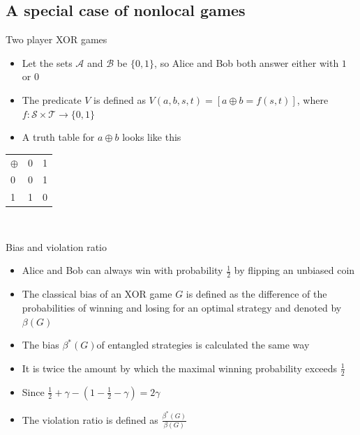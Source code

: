 \subsection{A special case of nonlocal games}
\begin{frame}{Two player XOR games}
\begin{itemize}
    \item Let the sets $\mathcal{A}$ and $\mathcal{B}$ be $\{0,1\}$, so Alice and Bob both answer either with $1$ or $0$
    \item The predicate $V$ is defined as $V(a,b,s,t) = [ a\oplus b = f(s,t)]$, where $f: \mathcal{S} \times \mathcal{T} \rightarrow \{0,1\}$
    \item A truth table for $a \oplus b$ looks like this
\end{itemize}
    \begin{center}
\begin{tabular}{l | c r }
$\oplus$ & 0 & 1 \\
\cline{1-3} 

0 & 0 & 1 \\
1 & 1 & 0 
\end{tabular}\\
\end{center}
\end{frame}

\begin{frame}{Bias and violation ratio}
\begin{itemize}
    \item Alice and Bob can always win with probability $\frac{1}{2}$ by flipping an unbiased coin
    \item The classical bias of an XOR game $G$ is defined as the difference of the probabilities of winning and losing for an optimal strategy and denoted by $\beta(G)$
    \item The bias $\beta^*(G)$of entangled strategies is calculated the same way 
    \item It is twice the amount by which the maximal winning probability exceeds $\frac{1}{2}$
    \item Since $\frac{1}{2}+ \gamma -(1-\frac{1}{2}-\gamma) = 2\gamma$
    \item The violation ratio is defined as $\frac{\beta^*(G)}{\beta(G)}$
\end{itemize}
    
\end{frame}

